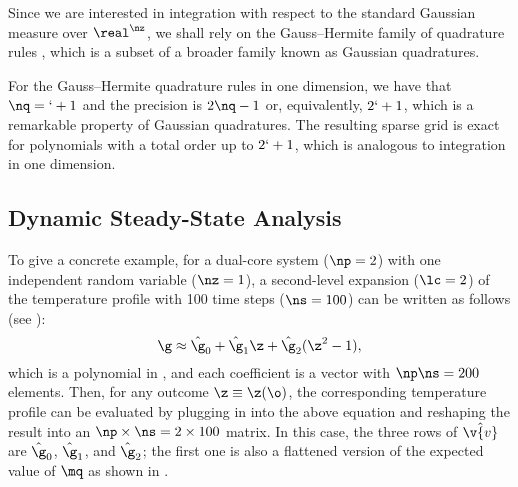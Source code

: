 Since we are interested in integration with respect to the standard Gaussian
measure over $\real^\nz$, we shall rely on the Gauss--Hermite family of
quadrature rules \cite{maitre2010}, which is a subset of a broader family known
as Gaussian quadratures.

For the Gauss--Hermite quadrature rules in one dimension, we have that $\nq =
\lq + 1$ and the precision is $2 \nq - 1$ \cite{heiss2008} or, equivalently, $2
\lq + 1$, which is a remarkable property of Gaussian quadratures. The resulting
sparse grid is exact for polynomials with a total order up to $2 \lq + 1$, which
is analogous to integration in one dimension.

\subsection{Dynamic Steady-State Analysis}

To give a concrete example, for a dual-core system ($\np = 2$) with one
independent random variable ($\nz = 1$), a second-level expansion ($\lc = 2$) of
the temperature profile with 100 time steps ($\ns = 100$) can be written as
follows (see ):
\[
  \g \approx \hat{\g}_0 + \hat{\g}_1 \z + \hat{\g}_2(\z^2 - 1),
\]
which is a polynomial in \z, and each coefficient is a vector with $\np \ns =
200$ elements. Then, for any outcome $\z \equiv \z(\o)$, the corresponding
temperature profile \mq can be evaluated by plugging in \z into the above
equation and reshaping the result into an $\np \times \ns = 2 \times 100$
matrix. In this case, the three rows of $\hat{\v{v}}$ are $\hat{\g}_0$,
$\hat{\g}_1$, and $\hat{\g}_2$; the first one is also a flattened version of the
expected value of $\mq$ as shown in .

